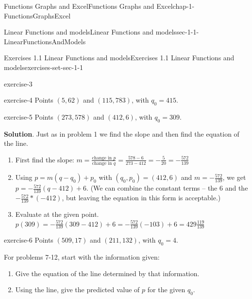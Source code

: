 \documentclass[oneside,10pt,]{book}
\numberwithin{equation}{section}
\begin{document}
\begin{chapterptx}{Functions Graphs and Excel}{}{Functions Graphs and Excel}{}{}{chap-1-FunctionsGraphsExcel}
\begin{sectionptx}{Linear Functions and models}{}{Linear Functions and models}{}{}{sec-1-1-LinearFunctionsAndModels}
\begin{exercises-subsection-numberless}{Exercises 1.1 Linear Functions and models}{}{Exercises 1.1 Linear Functions and models}{}{}{exercises-set-sec-1-1}
\begin{exercisegroup}
\begin{divisionexerciseeg}{3}{}{}{exercise-3}
\begin{enumerate}[label=(\alph*)]
\end{enumerate}
\end{divisionexerciseeg}%
\begin{divisionexerciseeg}{4}{}{}{exercise-4}%
\hypertarget{p-84}{}%
Points \((5,62)\) and \((115,783)\), with \(q_0=415\).%
\end{divisionexerciseeg}%
\begin{divisionexerciseeg}{5}{}{}{exercise-5}%
\hypertarget{p-85}{}%
Points \((273,578)\) and \((412,6)\), with \(q_0=309\).%
\par\smallskip%
\noindent\textbf{Solution}.\hypertarget{solution-3}{}\quad%
\hypertarget{p-86}{}%
Just as in problem 1 we find the slope and then find the equation of the line.%
\leavevmode%
\begin{enumerate}[label=(\alph*)]
\item\hypertarget{li-33}{}\hypertarget{p-87}{}%
First find the slope: \(m=  \frac{\text{change in }p}{\text{change in }q}
=  \frac{578-6}{273-412}=-\frac{5}{20}=-\frac{572}{139}\)%
\item\hypertarget{li-34}{}\hypertarget{p-88}{}%
Using \(p=m (q-q_0)+p_0\) with \((q_0,p_0 )=(412, 6)\) and \(m = -\frac{572}{139}\), we get \(p=-\frac{572}{139}(q-412)+6\).  (We can combine the constant terms – the \(6\) and the \(-\frac{572}{139}*(-412)\), but leaving the equation in this form is acceptable.)%
\item\hypertarget{li-35}{}\hypertarget{p-89}{}%
Evaluate at the given point.  \(p(309)=-\frac{572}{139}(309-412)+6
=-\frac{572}{139}(-103)+6=429\frac{119}{139}\)%
\end{enumerate}
\end{divisionexerciseeg}%
\begin{divisionexerciseeg}{6}{}{}{exercise-6}%
\hypertarget{p-90}{}%
Points \((509,17)\) and \((211,132)\), with \(q_0=4\).%
\end{divisionexerciseeg}%
\end{exercisegroup}
\par\medskip\noindent
\par\medskip\noindent%
\hypertarget{exercisegroup-2}{}%
\hypertarget{p-91}{}%
For problems 7-12, start with the information given:%
\leavevmode%
\begin{enumerate}[label=(\alph*)]
\item\hypertarget{li-36}{}\hypertarget{p-92}{}%
Give the equation of the line determined by that information.%
\item\hypertarget{li-37}{}\hypertarget{p-93}{}%
Using the line, give the predicted value of \(p\) for the given \(q_0\).%

\end{enumerate}
\end{exercises-subsection-numberless}
\end{sectionptx}
\end{chapterptx}
\end{document}

